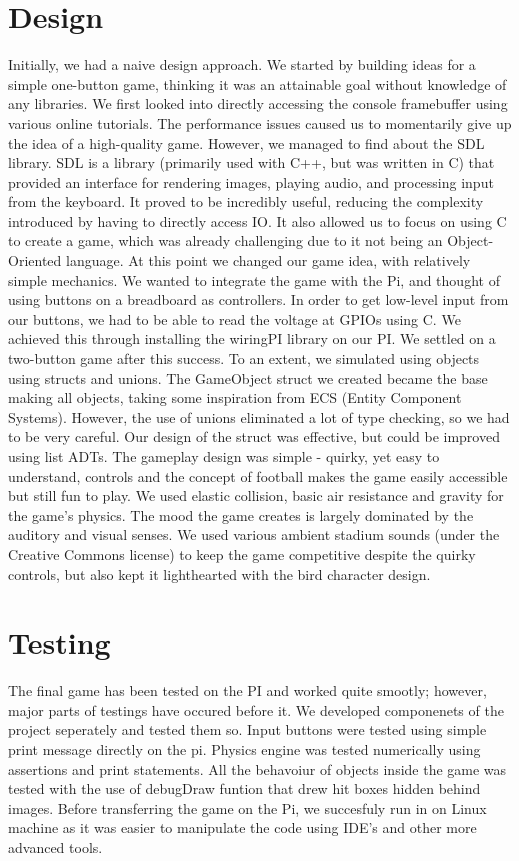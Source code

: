 \documentclass[11pt]{article}
\begin{document}
\section{Design}
Initially, we had a naive design approach. We started by building ideas for a simple one-button game, thinking it was an attainable goal without knowledge of any libraries. We first looked into directly accessing the console framebuffer using various online tutorials. The performance issues caused us to momentarily give up the idea of a high-quality game.
However, we managed to find about the SDL library. SDL is a library (primarily used with C++, but was written in C) that provided an interface for rendering images, playing audio, and processing input from the keyboard. It proved to be incredibly useful, reducing the complexity introduced by having to directly access IO. It also allowed us to focus on using C to create a game, which was already challenging due to it not being an Object-Oriented language. At this point we changed our game idea, with relatively simple mechanics.
We wanted to integrate the game with the Pi, and thought of using buttons on a breadboard as controllers. In order to get low-level input from our buttons, we had to be able to read the voltage at GPIOs using C. We achieved this through installing the wiringPI library on our PI. We settled on a two-button game after this success.
To an extent, we simulated using objects using structs and unions. The GameObject struct we created became the base making all objects, taking some inspiration from ECS (Entity Component Systems). However, the use of unions eliminated a lot of type checking, so we had to be very careful. Our design of the struct was effective, but could be improved using list ADTs.
The gameplay design was simple - quirky, yet easy to understand, controls and the concept of football makes the game easily accessible but still fun to play. We used elastic collision, basic air resistance and gravity for the game's physics.
The mood the game creates is largely dominated by the auditory and visual senses. We used various ambient stadium sounds (under the Creative Commons license) to keep the game competitive despite the quirky controls, but also kept it lighthearted with the bird character design.



\section{Testing}
The final game has been tested on the PI and worked quite smootly; however, major parts of testings have occured before it. We developed componenets of the project seperately and tested them so. Input buttons were tested using simple print message directly on the pi. Physics engine was tested numerically using assertions and print statements. All the behavoiur of objects inside the game was tested with the use of debugDraw funtion that drew hit boxes hidden behind images. Before transferring the game on the Pi, we succesfuly run in on Linux machine as it was easier to manipulate the code using IDE's and other more advanced tools. 
\end{document}
